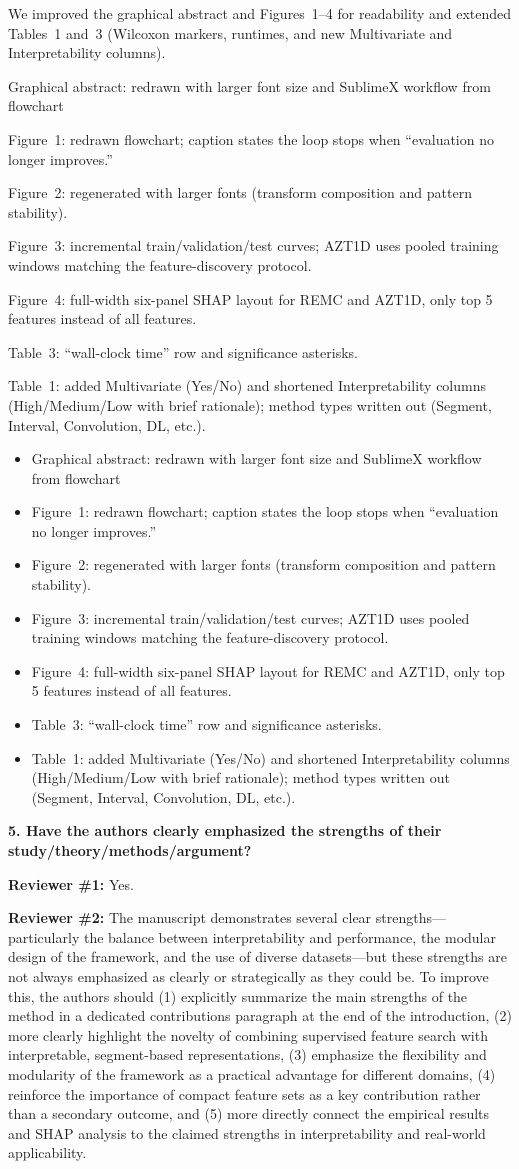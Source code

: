 \documentclass[11pt]{article}
\makeatletter
\newcommand{\rsp}{\par\vspace{0.9em}}
\newcommand{\rcbothq}[3]{%
  \begin{reviewerbox}\textbf{#1}\par\smallskip\textbf{Reviewer \#1:} #2\par\smallskip%
  \textbf{Reviewer \#2:} #3\end{reviewerbox}}
\newcommand{\response}[2]{%
  \begin{responsebox}#1%
  \def\@responseitems{#2}%
  \ifx\@responseitems\empty\else\begin{itemize}[nosep,leftmargin=1.2em]#2\end{itemize}\fi
  \end{responsebox}\rsp}
\makeatother
\begin{document}
\response{We improved the graphical abstract and Figures~1--4 for readability and extended Tables~1 and~3 (Wilcoxon markers,
runtimes, and new Multivariate and Interpretability columns).}{
  \item Graphical abstract: redrawn with larger font size and SublimeX workflow from flowchart
  \item Figure~1: redrawn flowchart; caption states the loop stops when ``evaluation no longer
    improves.''
  \item Figure~2: regenerated with larger fonts (transform composition and pattern stability).
  \item Figure~3: incremental train/validation/test curves; AZT1D uses pooled training windows
    matching the feature-discovery protocol.
  \item Figure~4: full-width six-panel SHAP layout for REMC and AZT1D, only top 5 features instead of all features.
  \item Table~3: ``wall-clock time'' row and significance asterisks.
  \item Table~1: added Multivariate (Yes/No) and shortened Interpretability columns (High/Medium/Low
    with brief rationale); method types written out (Segment, Interval, Convolution, DL, etc.).
}

\rcbothq{5. Have the authors clearly emphasized the strengths of their
study/theory/methods/argument?}{Yes.}
{The manuscript demonstrates several clear strengths---particularly the balance between
interpretability and performance, the modular design of the framework, and the use of diverse
datasets---but these strengths are not always emphasized as clearly or strategically as they
could be.
To improve this, the authors should (1) explicitly summarize the main strengths of the method in
a dedicated contributions paragraph at the end of the introduction, (2) more clearly highlight the
novelty of combining supervised feature search with interpretable, segment-based representations,
(3) emphasize the flexibility and modularity of the framework as a practical advantage for
different domains, (4) reinforce the importance of compact feature sets as a key contribution
rather than a secondary outcome, and (5) more directly connect the empirical results and SHAP
analysis to the claimed strengths in interpretability and real-world applicability.}
\end{document}

